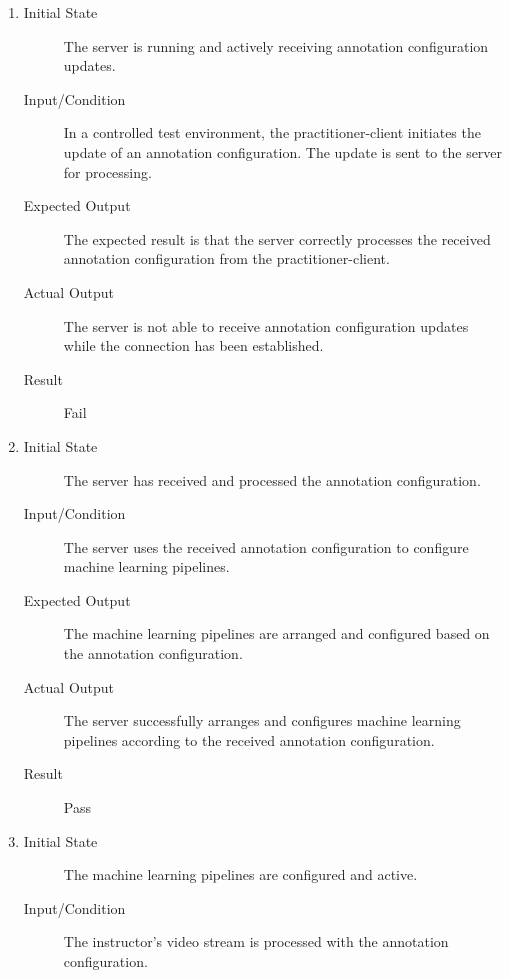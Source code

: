 \documentclass[12pt, titlepage]{article}
\begin{document}
\begin{enumerate}[FR-T1]
  \item \label{FRT7}
    \begin{description}
    \item[Initial State] The server is running and actively receiving annotation
      configuration updates.
    \item[Input/Condition] In a controlled test environment, the practitioner-client
      initiates the update of an annotation configuration. The update is sent to
      the server for processing.
    \item[Expected Output] The expected result is that the server correctly processes
      the received annotation configuration from the practitioner-client.
    \item[Actual Output] The server is not able to receive annotation
    configuration updates while the connection has been established.
    \item[Result] Fail
    \end{description}
  \item \label{FRT8}
    \begin{description}
    \item[Initial State] The server has received and processed the annotation
      configuration.
    \item[Input/Condition] The server uses the received annotation configuration to
      configure machine learning pipelines.
    \item[Expected Output] The machine learning pipelines are arranged and configured
      based on the annotation configuration.
    \item[Actual Output] The server successfully arranges and configures machine 
    learning pipelines according to the received annotation configuration.
    \item[Result] Pass
    \end{description}
  \item \label{FRT9}
    \begin{description}
    \item[Initial State] The machine learning pipelines are configured and active.
    \item[Input/Condition] The instructor's video stream is processed with the
      annotation configuration.

\end{description}
\end{enumerate}
\end{document}
